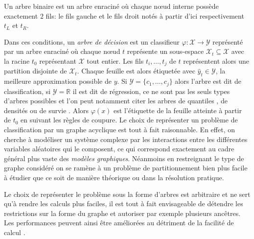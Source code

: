 \begin{definition}
    Un arbre binaire est un arbre enraciné où chaque nœud interne possède exactement $2$ fils: le fils gauche et le fils droit notés à partir d'ici respectivement $t_L$ et $t_R$.
\end{definition}

Dans ces conditions, un \emph{arbre de décision} est un classifieur $\varphi : \mathcal{X} \rightarrow \mathcal{Y}$ représenté par un arbre enraciné où chaque nœud $t$ représente un sous-espace $\mathcal{X}_t \subseteq \mathcal{X}$ avec la racine $t_0$ représentant $\mathcal{X}$ tout entier. Les fils $t_i, \dotsc, t_j$ de $t$ représentent alors une partition disjointe de $\mathcal{X}_t$. Chaque feuille est alors étiquetée avec $\hat{y}_t \in \mathcal{Y}$, la meilleure approximation possible de $y$. Si $\mathcal{Y} = \{c_1,\dotsc,c_j\}$ alors l'arbre est dit de classification, si $\mathcal{Y} = \mathbb{R}$ il est dit de régression, ce ne sont pas les seuls types d'arbres possibles et l'on peut notamment citer les arbres de quantiles \citep{Meinshausen2006}, de densités \citep{Ram2011} ou de survie \citep{Ishwaran2008}. Alors $\varphi(x)$ est l'étiquette de la feuille atteinte à partir de $t_0$ en suivant les règles de coupure. Le choix de représenter un problème de classification par un graphe acyclique est tout à fait raisonnable. En effet, on cherche à modéliser un système complexe par les interactions entre les différentes variables aléatoires qui le composent, ce qui correspond exactement au cadre général plus vaste des \emph{modèles graphiques}. Néanmoins en restreignant le type de graphe considéré on se ramène à un problème de partitionnement bien plus facile à étudier que ce soit de manière théorique ou dans la résolution pratique.

Le choix de représenter le problème sous la forme d'arbres est arbitraire et ne sert qu'à rendre les calculs plus faciles, il est tout à fait envisageable de détendre les restrictions sur la forme du graphe et autoriser par exemple plusieurs ancêtres. Les performances peuvent ainsi être améliorées au détriment de la facilité de calcul \citep{Shotton2013a}.

